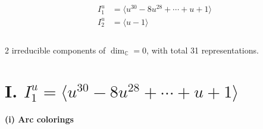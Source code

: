\documentclass[1p]{elsarticle_modified}
\theoremstyle{definition}
\begin{document}
\begin{align*}
I^u_{1}&=\langle 
u^{30}-8 u^{28}+\cdots+u+1\rangle \\
I^u_{2}&=\langle 
u-1\rangle \\
\\
\end{align*}
\raggedright * 2 irreducible components of $\dim_{\mathbb{C}}=0$, with total 31 representations.\\
\newpage
\renewcommand{\arraystretch}{1}
\centering \section*{I. $I^u_{1}= \langle u^{30}-8 u^{28}+\cdots+u+1 \rangle$}
\flushleft \textbf{(i) Arc colorings}\\
\end{document}
